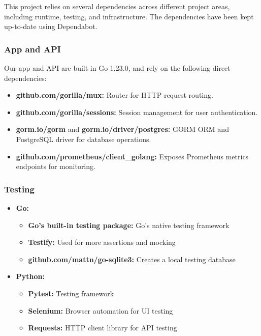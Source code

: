 This project relies on several dependencies across different project areas, including runtime, testing, and infrastructure. The dependencies have been kept up-to-date using Dependabot.

\subsubsection{App and API}
Our app and API are built in Go 1.23.0, and rely on the following direct dependencies:
\begin{itemize}
    \item \textbf{github.com/gorilla/mux:} Router for HTTP request routing.
    \item \textbf{github.com/gorilla/sessions:} Session management for user authentication.
    \item \textbf{gorm.io/gorm} and \textbf{gorm.io/driver/postgres:} GORM ORM and PostgreSQL driver for database operations.
    \item \textbf{github.com/prometheus/client\_golang:} Exposes Prometheus metrics endpoints for monitoring.
\end{itemize}

\subsubsection{Testing}
\begin{itemize}
    \item \textbf{Go:}
    \begin{itemize}
        \item \textbf{Go's built-in testing package:} Go's native testing framework
        \item \textbf{Testify:} Used for more assertions and mocking
        \item \textbf{github.com/mattn/go-sqlite3:} Creates a local testing database
    \end{itemize}

\item \textbf{Python:}
\begin{itemize}
    \item \textbf{Pytest:} Testing framework
    \item \textbf{Selenium:} Browser automation for UI testing
    \item \textbf{Requests:} HTTP client library for API testing
\end{itemize}
\end{itemize}

